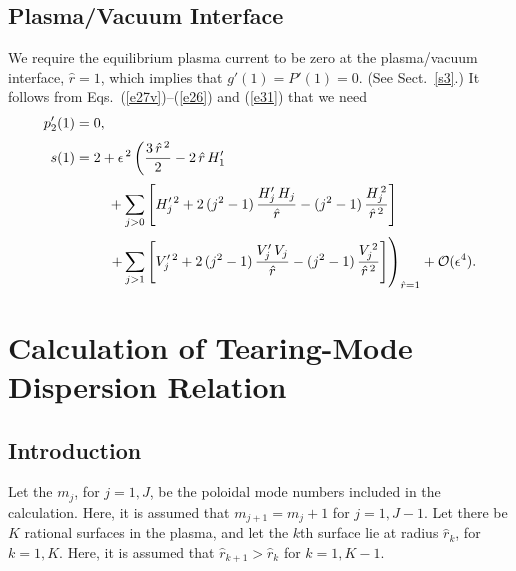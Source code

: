 \documentclass[12pt,prb,aps]{revtex4-1}
\begin{document}
\subsection{Plasma/Vacuum Interface}
We require the equilibrium plasma current to be zero at the plasma/vacuum interface, $\hat{r}=1$, which
implies that $g'(1)=P'(1)= 0$. (See Sect.~\ref{s3}.) It follows from Eqs.~(\ref{e27v})--(\ref{e26}) and (\ref{e31}) that we need\,\cite{am1}
\begin{align}
p_2'(1) &= 0,\label{e222}\\[0.5ex]
s(1) &= 2+ \epsilon^{\,2}\left(\frac{3\,\hat{r}^{\,2}}{2}-2\,\hat{r}\,H_1'\right.\nonumber\\[0.5ex]
&\phantom{===}
+\sum_{j>0}\left[H_j'^{\,2}+2\,(j^2-1)\,\frac{H_j'\,H_j}{\hat{r}}-(j^2-1)\,\frac{H_j^{\,2}}{\hat{r}^{\,2}}\right]\nonumber\\[0.5ex]
&\phantom{===}\left.+\sum_{j>1}\left[V_j'^{\,2}+2\,(j^2-1)\,\frac{V_j'\,V_j}{\hat{r}}-(j^2-1)\,\frac{V_j^{\,2}}{\hat{r}^{\,2}}\right]\right)_{\hat{r}=1}
+{\cal O}(\epsilon^4).\label{e223}
\end{align}

\section{Calculation of  Tearing-Mode Dispersion Relation}\label{etm}
\subsection{Introduction}
Let the $m_j$, for $j=1,J$, be the poloidal mode numbers included in the calculation. Here, it is assumed that $m_{j+1}=m_j+1$ for $j=1,J-1$. 
Let there be $K$ rational surfaces in the plasma, and let the $k$th surface lie at radius $\hat{r}_k$, for $k=1,K$. Here,
it is assumed that $\hat{r}_{k+1}>\hat{r}_k$ for $k=1,K-1$. 
\end{document}
